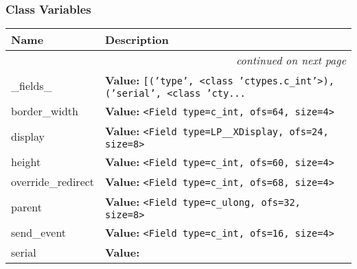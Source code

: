 
  \subsubsection{Class Variables}

    \vspace{-1cm}
\hspace{\varindent}\begin{longtable}{|p{\varnamewidth}|p{\vardescrwidth}|l}
\cline{1-2}
\cline{1-2} \centering \textbf{Name} & \centering \textbf{Description}& \\
\cline{1-2}
\endhead\cline{1-2}\multicolumn{3}{r}{\small\textit{continued on next page}}\\\endfoot\cline{1-2}
\endlastfoot\raggedright \_\-f\-i\-e\-l\-d\-s\-\_\- & \raggedright \textbf{Value:} 
{\tt \texttt{[}\texttt{(}\texttt{'}\texttt{type}\texttt{'}\texttt{, }{\textless}class 'ctypes.c\_int'{\textgreater}\texttt{)}\texttt{, }\texttt{(}\texttt{'}\texttt{serial}\texttt{'}\texttt{, }{\textless}class 'cty\texttt{...}}&\\
\cline{1-2}
\raggedright b\-o\-r\-d\-e\-r\-\_\-w\-i\-d\-t\-h\- & \raggedright \textbf{Value:} 
{\tt {\textless}Field type=c\_int, ofs=64, size=4{\textgreater}}&\\
\cline{1-2}
\raggedright d\-i\-s\-p\-l\-a\-y\- & \raggedright \textbf{Value:} 
{\tt {\textless}Field type=LP\_\_XDisplay, ofs=24, size=8{\textgreater}}&\\
\cline{1-2}
\raggedright h\-e\-i\-g\-h\-t\- & \raggedright \textbf{Value:} 
{\tt {\textless}Field type=c\_int, ofs=60, size=4{\textgreater}}&\\
\cline{1-2}
\raggedright o\-v\-e\-r\-r\-i\-d\-e\-\_\-r\-e\-d\-i\-r\-e\-c\-t\- & \raggedright \textbf{Value:} 
{\tt {\textless}Field type=c\_int, ofs=68, size=4{\textgreater}}&\\
\cline{1-2}
\raggedright p\-a\-r\-e\-n\-t\- & \raggedright \textbf{Value:} 
{\tt {\textless}Field type=c\_ulong, ofs=32, size=8{\textgreater}}&\\
\cline{1-2}
\raggedright s\-e\-n\-d\-\_\-e\-v\-e\-n\-t\- & \raggedright \textbf{Value:} 
{\tt {\textless}Field type=c\_int, ofs=16, size=4{\textgreater}}&\\
\cline{1-2}
\raggedright s\-e\-r\-i\-a\-l\- & \raggedright \textbf{Value:} 

\end{longtable}
